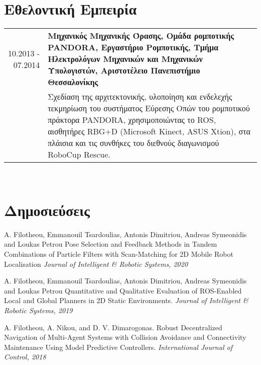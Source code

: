 \documentclass[a4paper,10pt,twoside]{article}
\begin{document}

\section{Εθελοντική Εμπειρία}

\begin{tabular}{rp{12cm}}
10.2013 - 07.2014 & \textbf{Μηχανικός Μηχανικής Όρασης, Ομάδα ρομποτικής PANDORA, Εργαστήριο Ρομποτικής,
                    Τμήμα Ηλεκτρολόγων Μηχανικών και Μηχανικών Υπολογιστών, Αριστοτέλειο Πανεπιστήμιο Θεσσαλονίκης} \\
                  & Σχεδίαση της αρχιτεκτονικής, υλοποίηση και ενδελεχής τεκμηρίωση
                    του συστήματος Εύρεσης Οπών του ρομποτικού πράκτορα PANDORA, χρησιμοποιώντας το ROS, αισθητήρες RBG+D
                    (Microsoft Kinect, ASUS Xtion), στα πλάισια και τις συνθήκες του διεθνούς διαγωνισμού RoboCup Rescue.\\
\end{tabular} \\

\section{Δημοσιεύσεις}

A. Filotheou, Emmanouil Tsardoulias, Antonis Dimitriou, Andreas Symeonidis and Loukas Petrou
Pose Selection and Feedback Methods in Tandem Combinations of Particle Filters with Scan-Matching for 2D Mobile Robot Localisation
\textit{Journal of Intelligent \& Robotic Systems, 2020}

A. Filotheou, Emmanouil Tsardoulias, Antonis Dimitriou, Andreas Symeonidis and Loukas Petrou
Quantitative and Qualitative Evaluation of ROS-Enabled Local and Global Planners in 2D Static Environments.
\textit{Journal of Intelligent \& Robotic Systems, 2019}

A. Filotheou, A. Nikou, and D. V. Dimarogonas. Robust Decentralized Navigation
of Multi-Agent Systems with Collision Avoidance and Connectivity Maintenance
Using Model Predictive Controllers. \textit{International Journal of Control, 2018}
\end{document}

